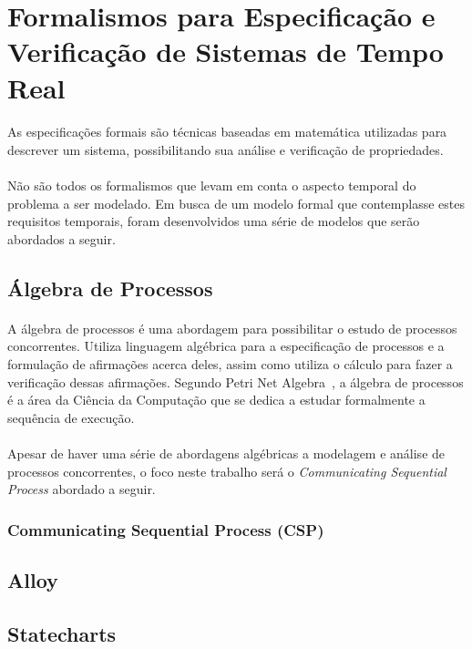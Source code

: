 \section{Formalismos para Especificação e Verificação de Sistemas de Tempo Real}
\paragraph{}
As especificações formais são técnicas baseadas em matemática utilizadas para descrever um sistema,
possibilitando sua análise e verificação de propriedades.
\paragraph{}
Não são todos os formalismos que levam em conta o aspecto temporal do problema a ser modelado.
Em busca de um modelo formal que contemplasse estes requisitos temporais, foram desenvolvidos uma série
de modelos que serão abordados a seguir.

\subsection{Álgebra de Processos}
\paragraph{}
A álgebra de processos é uma abordagem para possibilitar o estudo de processos concorrentes. Utiliza linguagem algébrica
para a especificação de processos e a formulação de afirmações acerca deles, assim como utiliza o cálculo para fazer a
verificação dessas afirmações. Segundo Petri Net Algebra~\cite{books/daglib/0003970}, a álgebra de processos é a área da
Ciência da Computação que se dedica a estudar formalmente a sequência de execução.
\paragraph{}
Apesar de haver uma série de abordagens algébricas a modelagem e análise de processos concorrentes, o foco neste trabalho
será o \textit{Communicating Sequential Process} abordado a seguir.

\subsubsection{Communicating Sequential Process (CSP)}
\paragraph{}


\subsection{Alloy}
\paragraph{}


\subsection{Statecharts}
\paragraph{}

